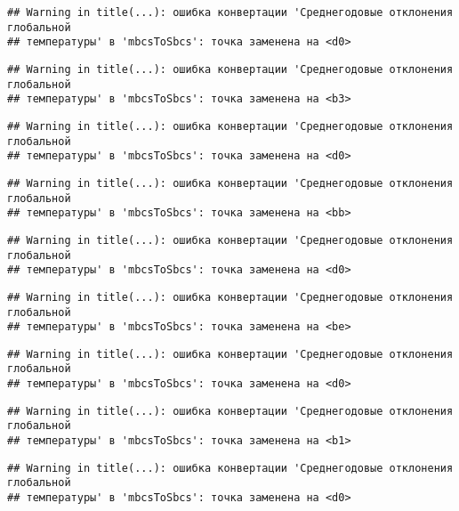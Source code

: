 \documentclass[
]{article}
\begin{document}
\begin{verbatim}
## Warning in title(...): ошибка конвертации 'Среднегодовые отклонения глобальной
## температуры' в 'mbcsToSbcs': точка заменена на <d0>
\end{verbatim}

\begin{verbatim}
## Warning in title(...): ошибка конвертации 'Среднегодовые отклонения глобальной
## температуры' в 'mbcsToSbcs': точка заменена на <b3>
\end{verbatim}

\begin{verbatim}
## Warning in title(...): ошибка конвертации 'Среднегодовые отклонения глобальной
## температуры' в 'mbcsToSbcs': точка заменена на <d0>
\end{verbatim}

\begin{verbatim}
## Warning in title(...): ошибка конвертации 'Среднегодовые отклонения глобальной
## температуры' в 'mbcsToSbcs': точка заменена на <bb>
\end{verbatim}

\begin{verbatim}
## Warning in title(...): ошибка конвертации 'Среднегодовые отклонения глобальной
## температуры' в 'mbcsToSbcs': точка заменена на <d0>
\end{verbatim}

\begin{verbatim}
## Warning in title(...): ошибка конвертации 'Среднегодовые отклонения глобальной
## температуры' в 'mbcsToSbcs': точка заменена на <be>
\end{verbatim}

\begin{verbatim}
## Warning in title(...): ошибка конвертации 'Среднегодовые отклонения глобальной
## температуры' в 'mbcsToSbcs': точка заменена на <d0>
\end{verbatim}

\begin{verbatim}
## Warning in title(...): ошибка конвертации 'Среднегодовые отклонения глобальной
## температуры' в 'mbcsToSbcs': точка заменена на <b1>
\end{verbatim}

\begin{verbatim}
## Warning in title(...): ошибка конвертации 'Среднегодовые отклонения глобальной
## температуры' в 'mbcsToSbcs': точка заменена на <d0>
\end{verbatim}
\end{document}

